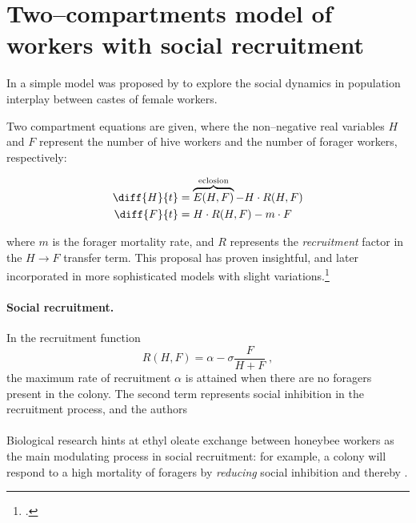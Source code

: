 \section[Two--compartments model with social recruitment]{Two--compartments model of workers with social recruitment}

In \citeyear{khoury2011} a simple model was proposed by \citeauthor{khoury2011} to explore the social dynamics in
population interplay between castes of female workers.

Two compartment equations are given, where the non--negative real variables $H$ and $F$ represent the number of hive workers and the number of forager workers, respectively:

\begin{align}
    \diff{H}{t} &= \overbrace{E(H,F)}^{\text{eclosion}}- H \cdot R(H,F) \label{eq:kh11h} \\
    \diff{F}{t} &= H \cdot R(H,F)  - m \cdot F \label{eq:kh11f}
\end{align}

where $m$ is the forager mortality rate, and $R$ represents the \emph{recruitment} factor in the $H \to F$ transfer term.
This proposal has proven insightful, and later incorporated in more sophisticated models with slight variations.\footcite{ratti2017}

\paragraph{Social recruitment.}
In the recruitment function
\begin{equation}
    \label{eq:Recr}
    R(H,F) = \alpha - \sigma \frac{F}{H+F} \; ,
\end{equation}
the maximum rate of recruitment $\alpha$ is attained when there are no foragers present in the colony.
The second term represents social inhibition in the recruitment process, and the authors

\paragraph{}
Biological research hints at ethyl oleate exchange between honeybee workers as the main modulating process in social recruitment: for example, a colony will respond to a high mortality of foragers by \emph{reducing} social inhibition and thereby .

